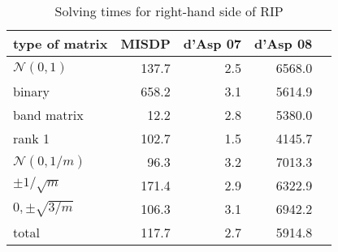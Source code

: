 \begin{table} 
 \begin{scriptsize} \caption{Solving times for right-hand side of RIP} 
 \label{rhsTime} 
 \begin{tabular*}{0.48\textwidth}{@{}l@{\;\;\extracolsep{\fill}}rrrr@{}}\toprule 
 type of matrix & MISDP & d'Asp 07 & d'Asp 08 \\ \midrule 
$\mathcal{N}(0,1)$& \num{137.7} & \num{2.5} & \num{6568.0} \\ 
 binary& \num{658.2} & \num{3.1} & \num{5614.9} \\ 
 band matrix& \num{12.2} & \num{2.8} & \num{5380.0} \\ 
 rank 1& \num{102.7} & \num{1.5} & \num{4145.7} \\ 
 $\mathcal{N}(0,1/m)$& \num{96.3} & \num{3.2} & \num{7013.3} \\ 
 $\pm 1/\sqrt{m}$& \num{171.4} & \num{2.9} & \num{6322.9} \\ 
 $0, \pm \sqrt{3/m}$& \num{106.3} & \num{3.1} & \num{6942.2} \\ 
 \midrule 
total & \num{117.7} & \num{2.7} & \num{5914.8} \\ 
 \bottomrule 
 \end{tabular*} 
 \end{scriptsize} 
 \end{table} 
